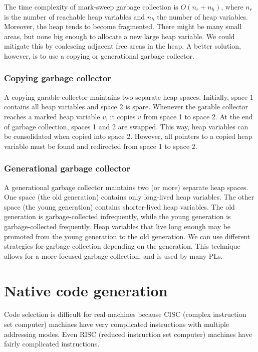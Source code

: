 \documentclass[a4paper, openany]{memoir}
\begin{document}
The time complexity of mark-sweep garbage collection is $O(n_r + n_h)$, where $n_r$ is the number of reachable heap variables and $n_h$ the number of heap variables. Moreover, the heap tends to become fragmented. There might be many small areas, but none big enough to allocate a new large heap variable. We could mitigate this by coalescing adjacent free areas in the heap. A better solution, however, is to use a copying or generational garbage collector.

\subsubsection{Copying garbage collector}
A copying garable collector maintains two separate heap spaces. Initially, space 1 contains all heap variables and space 2 is spare. Whenever the garable collector reaches a marked heap variable $v$, it copies $v$ from space 1 to space 2. At the end of garbage collection, spaces 1 and 2 are swapped. This way, heap variables can be consolidated when copied into space 2. However, all pointers to a copied heap variable must be found and redirected from space 1 to space 2.

\subsubsection{Generational garbage collector}
A generational garbage collector maintains two (or more) separate heap spaces. One space (the old generation) contains only long-lived heap variables. The other space (the young generation) contains shorter-lived heap variables. The old generation is garbage-collected infrequently, while the young generation is garbage-collected frequently. Heap variables that live long enough may be promoted from the young generation to the old generation. We can use different strategies for garbage collection depending on the generation. This technique allows for a more focused garbage collection, and is used by many PLs. 

\newpage

\section{Native code generation}
Code selection is difficult for real machines because CISC (complex instruction set computer) machines have very complicated instructions with multiple addressing modes. Even RISC (reduced instruction set computer) machines have fairly complicated instructions.
\end{document}
